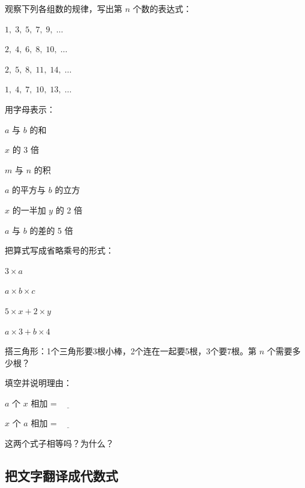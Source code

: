 \begin{exercise}
\item 观察下列各组数的规律，写出第 $n$ 个数的表达式：
  \begin{subexercise}
    \item $1,\;3,\;5,\;7,\;9,\;\ldots$
    \item $2,\;4,\;6,\;8,\;10,\;\ldots$
    \item $2,\;5,\;8,\;11,\;14,\;\ldots$
    \item $1,\;4,\;7,\;10,\;13,\;\ldots$
  \end{subexercise}

\item 用字母表示：
  \begin{subexercise}
    \item $a$ 与 $b$ 的和
    \item $x$ 的 3 倍
    \item $m$ 与 $n$ 的积
    \item $a$ 的平方与 $b$ 的立方
    \item $x$ 的一半加 $y$ 的 2 倍
    \item $a$ 与 $b$ 的差的 5 倍
  \end{subexercise}

\item 把算式写成省略乘号的形式：
  \begin{subexercise}
    \item $3\times a$
    \item $a\times b\times c$
    \item $5\times x + 2\times y$
    \item $a\times 3 + b\times 4$
  \end{subexercise}

\item 搭三角形：1个三角形要3根小棒，2个连在一起要5根，3个要7根。第 $n$ 个需要多少根？

\item 填空并说明理由：
  \begin{subexercise}
    \item $a$ 个 $x$ 相加 = $\underline{\qquad}$
    \item $x$ 个 $a$ 相加 = $\underline{\qquad}$
    \item 这两个式子相等吗？为什么？
  \end{subexercise}
\end{exercise}


\subsection*{把文字翻译成代数式}

